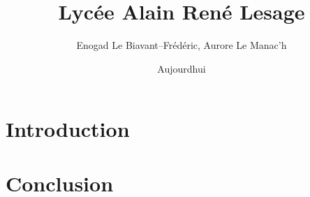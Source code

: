 \documentclass{report}
\title{
		{}\\
		{\large Lycée Alain René Lesage}\\
}
\author{Enogad Le Biavant--Frédéric, Aurore Le Manac'h}
\date{Aujourdhui}
\begin{document}
\maketitle
\tableofcontents
\chapter{Introduction}


\chapter{Conclusion}
%
\end{document}
